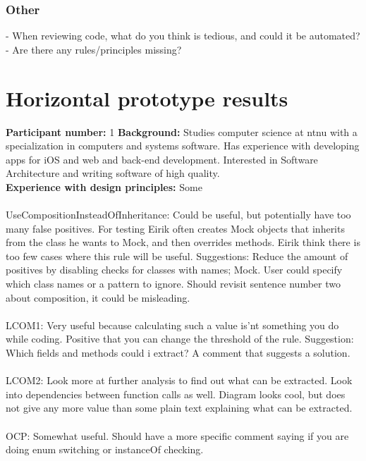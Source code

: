 \subsubsection*{Other} 
- When reviewing code, what do you think is tedious, and could it be automated?
- Are there any rules/principles missing?

\clearpage
\section{Horizontal prototype results}
\textbf{Participant number:} 1 \newline
\textbf{Background:} Studies computer science at \gls{ntnu} with a specialization in computers and systems software. Has experience with developing apps for iOS and web and back-end development. Interested in Software Architecture and writing software of high quality. \\
\textbf{Experience with design principles:} Some \\\\

\noindent UseCompositionInsteadOfInheritance: Could be useful, but potentially have too many false positives. For testing Eirik often creates Mock objects that inherits from the class he wants to Mock, and then overrides methods. Eirik think there is too few cases where this rule will be useful. Suggestions: Reduce the amount of positives by disabling checks for classes with names; Mock. User could specify which class names or a pattern to ignore. Should revisit sentence number two about composition, it could be misleading.\\\\

\noindent LCOM1: Very useful because calculating such a value is'nt something you do while coding. Positive that you can change the threshold of the rule. Suggestion: Which fields and methods could i extract? A comment that suggests a solution. \\\\

\noindent LCOM2: Look more at further analysis to find out what can be extracted. Look into dependencies between function calls as well. Diagram looks cool, but does not give any more value than some plain text explaining what can be extracted. \\\\

\noindent OCP: Somewhat useful. Should have a more specific comment saying if you are doing enum switching or instanceOf checking. \\\\

